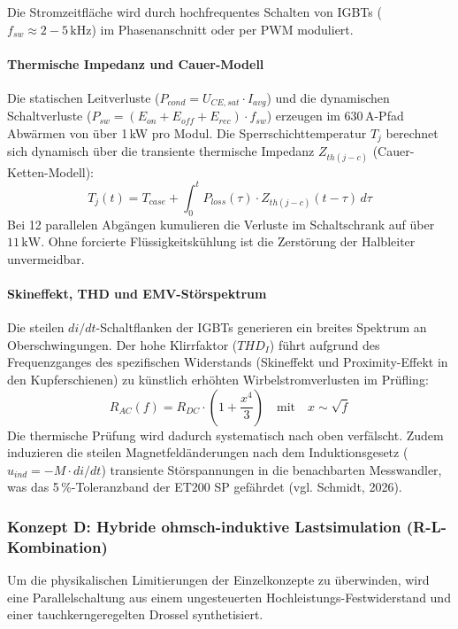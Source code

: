 Die Stromzeitfläche wird durch hochfrequentes Schalten von IGBTs ($f_{sw} \approx 2-5\,\text{kHz}$) im Phasenanschnitt oder per PWM moduliert.

\paragraph{Thermische Impedanz und Cauer-Modell}
Die statischen Leitverluste ($P_{cond} = U_{CE,sat} \cdot I_{avg}$) und die dynamischen Schaltverluste ($P_{sw} = (E_{on} + E_{off} + E_{rec}) \cdot f_{sw}$) erzeugen im 630\,A-Pfad Abwärmen von über 1\,kW pro Modul. Die Sperrschichttemperatur $T_j$ berechnet sich dynamisch über die transiente thermische Impedanz $Z_{th(j-c)}$ (Cauer-Ketten-Modell):
\begin{equation}
    T_j(t) = T_{case} + \int_{0}^{t} P_{loss}(\tau) \cdot Z_{th(j-c)}(t-\tau) \, d\tau
\end{equation}
Bei 12 parallelen Abgängen kumulieren die Verluste im Schaltschrank auf über $11\,\text{kW}$. Ohne forcierte Flüssigkeitskühlung ist die Zerstörung der Halbleiter unvermeidbar.

\paragraph{Skineffekt, THD und EMV-Störspektrum}
Die steilen $di/dt$-Schaltflanken der IGBTs generieren ein breites Spektrum an Oberschwingungen. Der hohe Klirrfaktor ($THD_I$) führt aufgrund des Frequenzganges des spezifischen Widerstands (Skineffekt und Proximity-Effekt in den Kupferschienen) zu künstlich erhöhten Wirbelstromverlusten im Prüfling:
\begin{equation}
    R_{AC}(f) = R_{DC} \cdot \left(1 + \frac{x^4}{3} \right) \quad \text{mit} \quad x \sim \sqrt{f}
\end{equation}
Die thermische Prüfung wird dadurch systematisch nach oben verfälscht. Zudem induzieren die steilen Magnetfeldänderungen nach dem Induktionsgesetz ($u_{ind} = - M \cdot di/dt$) transiente Störspannungen in die benachbarten Messwandler, was das 5\,\%-Toleranzband der ET200 SP gefährdet (vgl. Schmidt, 2026).


\subsubsection{Konzept D: Hybride ohmsch-induktive Lastsimulation (R-L-Kombination)}

Um die physikalischen Limitierungen der Einzelkonzepte zu überwinden, wird eine Parallelschaltung aus einem ungesteuerten Hochleistungs-Festwiderstand und einer tauchkerngeregelten Drossel synthetisiert.

